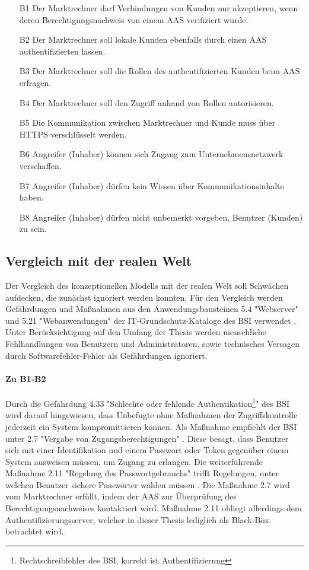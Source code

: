 \documentclass[11pt,a4paper]{report}
\begin{document}
\begin{enumerate}[leftmargin=*]
\item[B1] Der Marktrechner darf Verbindungen von Kunden nur akzeptieren, wenn deren Berechtigungsnachweis von einem AAS verifiziert wurde.
\item[B2] Der Marktrechner soll lokale Kunden ebenfalls durch einen AAS authentifizierten lassen.
\item[B3] Der Marktrechner soll die Rollen des authentifizierten Kunden beim AAS erfragen.
\item[B4] Der Marktrechner soll den Zugriff anhand von Rollen autorisieren.
\item[B5] Die Kommunikation zwischen Marktrechner und Kunde muss über HTTPS verschlüsselt werden.
\item[B6] Angreifer (Inhaber) können sich Zugang zum Unternehmensnetzwerk verschaffen.
\item[B7] Angreifer (Inhaber) dürfen kein Wissen über Kommunikationsinhalte haben.
\item[B8] Angreifer (Inhaber) dürfen nicht unbemerkt vorgeben, Benutzer (Kunden) zu sein.
\end{enumerate}

\subsection{Vergleich mit der realen Welt}

Der Vergleich des konzeptionellen Modells mit der realen Welt soll Schwächen aufdecken, die zunächst ignoriert werden konnten. Für den Vergleich werden Gefährdungen und Maßnahmen aus den Anwendungsbausteinen 5.4 "Webserver" und 5.21 "Webanwendungen" der IT-Grundschutz-Kataloge des BSI verwendet \cite{bsi_b5004, bsi_b5021}. Unter Berücksichtigung auf den Umfang der Thesis werden menschliche Fehlhandlungen von Benutzern und Administratoren, sowie technisches Versagen durch Softwarefehler-Fehler als Gefährdungen ignoriert.

\paragraph{Zu B1-B2} Durch die Gefährdung 4.33 "Schlechte oder fehlende Authentikation\footnote{Rechtschreibfehler des BSI, korrekt ist Authentifizierung}" \cite{bsi_g4033} des BSI wird darauf hingewiesen, dass Unbefugte ohne Maßnahmen der Zugriffskontrolle jederzeit ein System kompromittieren können. Als Maßnahme empfiehlt der BSI unter 2.7 "Vergabe von Zugangsberechtigungen" \cite{bsi_m2007}. Diese besagt, dass Benutzer sich mit einer Identifikation und einem Passwort oder Token gegenüber einem System ausweisen müssen, um Zugang zu erlangen. Die weiterführende Maßnahme 2.11 "Regelung des Passwortgebrauchs" trifft Regelungen, unter welchen Benutzer sichere Passwörter wählen müssen \cite{bsi_m2011}. Die Maßnahme 2.7 wird vom Marktrechner erfüllt, indem der AAS zur Überprüfung des Berechtigungsnachweises kontaktiert wird. Maßnahme 2.11 obliegt allerdings dem Authentifizierungsserver, welcher in dieser Thesis lediglich als Black-Box betrachtet wird.
\end{document}
